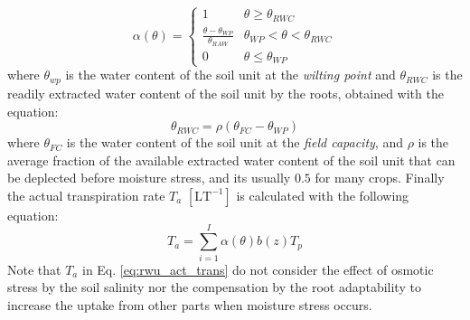 \documentclass[a4paper,12pt]{article}
\begin{document}
 \begin{equation} \label{eq:rwu_stress_func}
  \alpha(\theta)=%
  \begin{cases}
    1 & \theta\geq\theta_{RWC} \\
    \frac{\theta-\theta_{WP}}{\theta_{RAW}} & \theta_{WP}<\theta<\theta_{RWC}\\
    0 & \theta\leq\theta_{WP}
  \end{cases}
\end{equation}
where $\theta_{wp}$ is the water content of the soil unit at the \emph{wilting point} and $\theta_{RWC}$ is the readily extracted water content of the soil unit by the roots, obtained with the equation:
\begin{equation} \label{eq:rwu_root_stress}
    \theta_{RWC}=\rho(\theta_{FC}-\theta_{WP})
\end{equation}
where $\theta_{FC}$ is the water content of the soil unit at the \emph{field capacity}, and $\rho$ is the average fraction of the available extracted water content of the soil unit that can be deplected before moisture stress, and its usually $0.5$ for many crops.
Finally the actual transpiration rate $T_a$ $\mathrm{[LT^{-1}]}$ is calculated with the following equation:
\begin{equation} \label{eq:rwu_act_trans}
    T_a=\sum\limits_{i=1}^{I}\alpha(\theta)b(z)T_p
\end{equation}
Note that $T_a$ in Eq. \ref{eq:rwu_act_trans} do not consider the effect of osmotic stress by the soil salinity nor the compensation by the root adaptability to increase the uptake from other parts when moisture stress occurs. 
\end{document}
